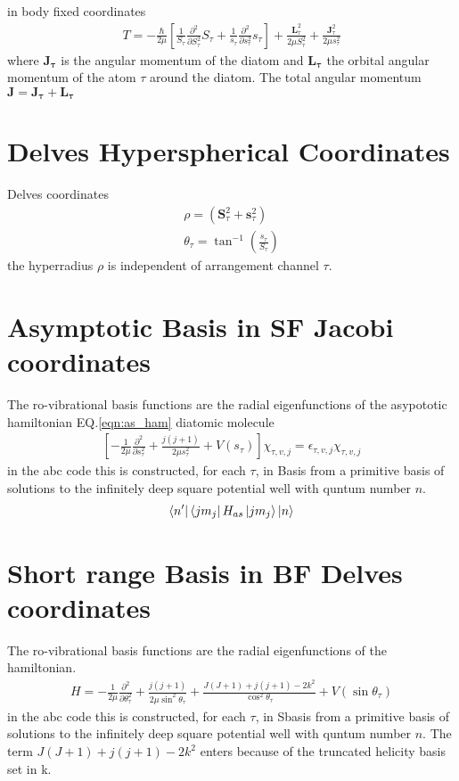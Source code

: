 \documentclass[aps,pra,onecolumn,showpacs,floatfix]{revtex4}
\begin{document}
in body fixed coordinates
\begin{align}\label{eqn:ms_jac}
	T = -\frac{\hbar}{2\mu}\left[\frac{1}{S_\tau}\frac{\partial^2}{\partial S^2_\tau}S_\tau + \frac{1}{s_\tau}\frac{\partial^2}{\partial s^2_\tau}s_\tau\right] +
	\frac{\mathbf{L}^2_\tau}{2\mu S^2_\tau} + \frac{\mathbf{J}^2_\tau}{2\mu s^2_\tau}
\end{align}
where $\mathbf{J_\tau}$ is the angular momentum of the diatom  and
$\mathbf{L_\tau}$ the orbital angular momentum of the atom $\tau$ around the
diatom. The total angular momentum $\mathbf{J}=\mathbf{J_\tau}+\mathbf{L_\tau}$

\section{Delves Hyperspherical Coordinates}
Delves coordinates\cite{Delves:1958,Delves:1960}
\begin{align}\label{eqn:delves}
	\rho = (\mathbf{S}^2_\tau + \mathbf{s}^2_\tau ) \\
	\theta_\tau = \tan^{-1}({\frac{s_\tau}{S_\tau}})
\end{align}
the hyperradius $\rho$ is independent of arrangement channel $\tau$.

\section{Asymptotic Basis in SF Jacobi coordinates}
The ro-vibrational basis functions are the radial eigenfunctions of the
asypototic hamiltonian  EQ.\ref{eqn:as_ham} diatomic molecule
\begin{align}\label{eqn:delves}
	\left[-\frac{1}{2\mu}\frac{\partial^2}{\partial s_\tau^2} + \frac{j(j+1)}{2\mu s_\tau^2} + V(s_\tau)\right]\chi_{\tau,v,j}= \epsilon_{\tau,v,j}\chi_{\tau,v,j}
\end{align}
in the abc code this is constructed, for each $\tau$, in Basis from a primitive basis of solutions to the
infinitely deep square potential well with quntum number $n$.
\begin{align}\label{eqn:delves}
	\bra{n'}\bra{jm_j}H_{as}\ket{jm_j}\ket{n}
\end{align}

\section{Short range Basis in BF Delves coordinates}
The ro-vibrational basis functions are the radial eigenfunctions of the
hamiltonian.
\begin{align}\label{eqn:delves}
	H = -\frac{1}{2\mu}\frac{\partial^2}{\partial \theta^2_\tau}
	+ \frac{j(j+1)}{2\mu \sin^2{\theta_\tau}}
	+ \frac{J(J+1)+j(j+1)-2k^2}{\cos^2{\theta_\tau}}
	    + V(\sin{\theta_\tau})
\end{align}
in the abc code this is constructed, for each $\tau$, in Sbasis from a primitive basis of solutions to the
infinitely deep square potential well with quntum number $n$. The term $J(J+1)+j(j+1)-2k^2$
enters because of the truncated helicity basis set in k\cite{Skouteris:2000}.
\end{document}
